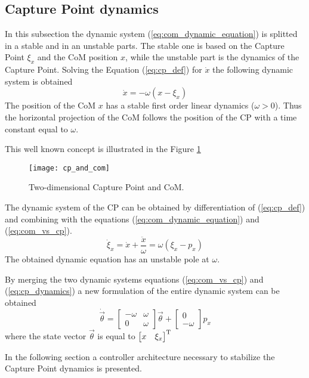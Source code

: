 \subsection{Capture Point dynamics}
In this subsection the dynamic system (\ref{eq:com_dynamic_equation}) is splitted in a stable and
in an unstable parts. The stable one is based on the Capture Point $\xi_x$ and the CoM position $x$, while the unstable part is the dynamics of the Capture Point.
Solving the Equation
(\ref{eq:cp_def}) for $\dot{x}$ the following dynamic system is obtained
\begin{equation}
  \label{eq:com_vs_cp}
  \dot{x} = - \omega (x - \xi_x)
\end{equation}
The position of the CoM $x$ has a stable first order linear dynamics ($\omega > 0$).
Thus the horizontal projection of the CoM follows the position
of the CP with a time constant equal to $\omega$.
\par
This well known concept is illustrated in the Figure \ref{fig:cp_and_com}
\begin{figure}[!ht]
  \centering
  \texttt{[image: cp\_and\_com]}
  \caption{Two-dimensional Capture Point and CoM. \label{fig:cp_and_com}}
\end{figure}
\par
The dynamic system of the CP can be obtained by differentiation of (\ref{eq:cp_def}) and combining
with the equations (\ref{eq:com_dynamic_equation}) and (\ref{eq:com_vs_cp}).
\begin{equation}
  \label{eq:cp_dynamics}
  \dot{\xi}_x = \dot{x} + \frac{\ddot{x}}{\omega} = \omega (\xi_x - p_x) 
\end{equation}
The obtained dynamic equation has an unstable pole at $\omega$.
\par
By merging the two dynamic systems equations (\ref{eq:com_vs_cp}) and (\ref{eq:cp_dynamics}) a new
formulation of the entire dynamic system can be obtained
\[
\dot{\vec{\theta}} =
\begin{bmatrix}
  -\omega & \omega \\
  0 & \omega
\end{bmatrix}
\vec{\theta} +
\begin{bmatrix}
  0 \\
  -\omega 
\end{bmatrix}
p_x
\]
where the state vector $\vec{\theta}$ is equal to $ \begin{bmatrix} x & \xi_x \end{bmatrix}^{\mathrm{T}}$
\par
In the following section a controller architecture necessary to stabilize the Capture Point
dynamics is presented.
\newpage
